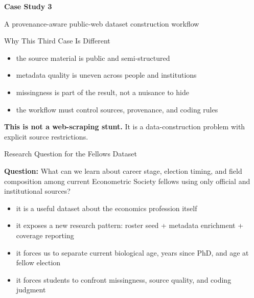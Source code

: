 \documentclass[10pt,english,aspectratio=169]{beamer}
\newcommand{\sectiondivider}[2]{%
\begin{frame}[plain,noframenumbering]
\begin{center}
\vfill
{\Large\textbf{#1}\par}
\vspace{0.35cm}
{\normalsize #2\par}
\vfill
\end{center}
\end{frame}
}
\begin{document}
\sectiondivider{Case Study 3}{A provenance-aware public-web dataset construction workflow}

\begin{frame}{Why This Third Case Is Different}
\begin{itemize}
    \item the source material is public and semi-structured
    \item metadata quality is uneven across people and institutions
    \item missingness is part of the result, not a nuisance to hide
    \item the workflow must control sources, provenance, and coding rules
\end{itemize}

\vspace{0.3cm}
\textbf{This is not a web-scraping stunt.} It is a data-construction problem with explicit source restrictions.
\end{frame}

\begin{frame}{Research Question for the Fellows Dataset}
\begin{tcolorbox}[colback=blue!3, colframe=RedTitle!60]
\textbf{Question:} What can we learn about career stage, election timing, and field composition among current Econometric Society fellows using only official and institutional sources?
\end{tcolorbox}

\vspace{0.25cm}
\begin{itemize}
    \item it is a useful dataset about the economics profession itself
    \item it exposes a new research pattern: roster seed + metadata enrichment + coverage reporting
    \item it forces us to separate current biological age, years since PhD, and age at fellow election
    \item it forces students to confront missingness, source quality, and coding judgment
\end{itemize}
\end{frame}
\end{document}
